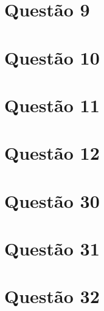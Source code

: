 \documentclass[
	12pt,				%
	openright,			%
	twoside,			%
	a4paper,			%
	english,			%
	french,				%
	spanish,			%
	brazil				%
	]{abntex2}
\begin{document}
\section{Questão 9}
\section{Questão 10}
\section{Questão 11}
\section{Questão 12}
\section{Questão 30}
\section{Questão 31}
\section{Questão 32}
\end{document}
